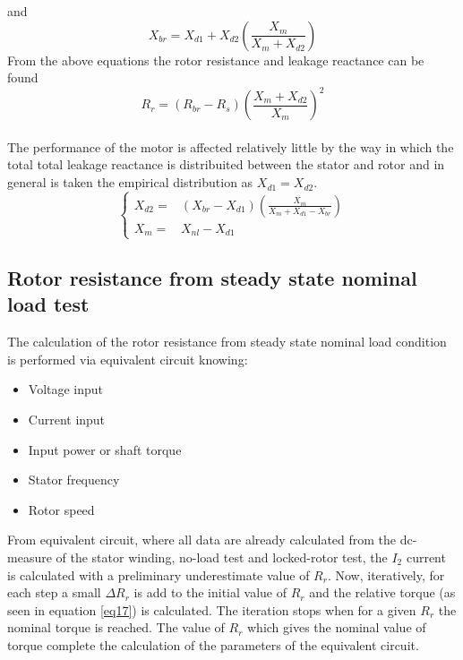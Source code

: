 \documentclass[11pt,a4paper,oneside]{book}
\numberwithin{equation}{section}
\theoremstyle{it}
\theoremstyle{definition}
\begin{document}
and 
\begin{equation} \label{eq26}
	X_{br} = X_{d1} + X_{d2} \left( \frac{X_m}{X_m+X_{d2}} \right)
\end{equation}
From the above equations the rotor resistance and leakage reactance can be found
\begin{equation} \label{eq27}
	R_{r} = \left(R_{br} - R_{s} \right) \left( \frac{X_m+X_{d2}}{X_m} \right)^2
\end{equation} \\
The performance of the motor is affected relatively little by the way in which the total total leakage reactance is distribuited between the stator and rotor and in general is taken the empirical distribution as $X_{d1} = X_{d2}$.
\begin{equation} \label{eq27}
	\left\{
	\begin{split} 
		X_{d2} = & \left(X_{br} - X_{d1}\right) \left( \frac{X_m}{X_m+X_{d1}-X_{br}} \right) \\
		X_{m} =  & X_{nl} - X_{d1}
	\end{split}\right.
\end{equation}


\subsection{Rotor resistance from steady state nominal load test}
The calculation of the rotor resistance from steady state nominal load condition is performed via equivalent circuit knowing:
\begin{itemize}
	\item Voltage input
	\item Current input
	\item Input power or shaft torque
	\item Stator frequency
	\item Rotor speed
\end{itemize}
From equivalent circuit, where all data are already calculated from the dc-measure of the stator winding, no-load test and locked-rotor test, the $I_2$ current is calculated with a preliminary underestimate value of $R_r$. Now, iteratively, for each step a small $\Delta R_r$ is add to the initial value of $R_r$ and the relative torque (as seen in equation \ref{eq17}) is calculated. The iteration stops when for a given $R_r$ the nominal torque is reached. The value of $R_r$ which gives the nominal value of torque complete the calculation of the parameters of the equivalent circuit.
\end{document}
